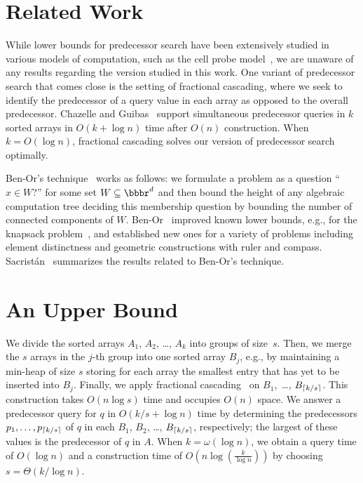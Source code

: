 \documentclass[orivec]{llncs}
\DeclarePairedDelimiter\ceil{\lceil}{\rceil}
\newcommand{\R}{\ensuremath{\bbbr}}
\begin{document}
\section{Related Work} \label{sec::relatedwork}
While lower bounds for predecessor search have been extensively studied in various models of computation, such as the cell probe model~\cite{sen2008lower}, we are unaware of any results regarding the version studied in this work. One variant of predecessor search that comes close is the setting of fractional cascading, where we seek to identify the predecessor of a query value in each array as opposed to the overall predecessor. Chazelle and Guibas~\cite{chazelle1986fractional} support simultaneous predecessor queries in \(k\) sorted arrays in \(O(k + \log n)\) time after \(O(n)\) construction. When \(k = O(\log n)\), fractional cascading solves our version of predecessor search optimally. 

Ben-Or's technique~\cite{benor1983lower} works as follows: we formulate a problem as a question \enquote{\(x \in W\)?} for some set \(W \subseteq \R^d\) and then bound the height of any algebraic computation tree deciding this membership question by bounding the number of connected components of \(W\). Ben-Or~\cite{benor1983lower} improved known lower bounds, e.g., for the knapsack problem~\cite{dobkin1978lower}, and established new ones for a variety of problems including element distinctness and geometric constructions with ruler and compass. Sacristán~\cite{sacristan1999lower} summarizes the results related to Ben-Or's technique. 

\section{An Upper Bound} \label{sec::upperbound}


We divide the sorted arrays \(A_1\), \(A_2\), \dots, \(A_k\) into groups of size~\(s\). Then, we merge the \(s\) arrays in the \(j\)-th group into one sorted array \(B_j\), e.g., by maintaining a min-heap of size \(s\) storing for each array the smallest entry that has yet to be inserted into \(B_j\). Finally, we apply fractional cascading~\cite{chazelle1986fractional} on \(B_1\),~\dots, \(B_{\ceil*{k/s}}\). This construction takes \(O(n \log s)\) time and occupies \(O(n)\) space. We answer a predecessor query for \(q\) in \(O(k/s + \log n)\) time by determining the predecessors \(p_1,\dots, p_{\ceil*{k/s}}\) of \(q\) in each \(B_1\), \(B_2\), \dots, \(B_{\ceil*{k/s}}\), respectively; the largest of these values is the predecessor of \(q\) in \(A\). When \(k = \omega(\log n)\), we obtain a query time of \(O(\log n)\) and a  construction time of \(O(n \log(\frac{k}{\log n}))\) by choosing \(s = \Theta\left({k/\log n}\right)\).  
\end{document}
